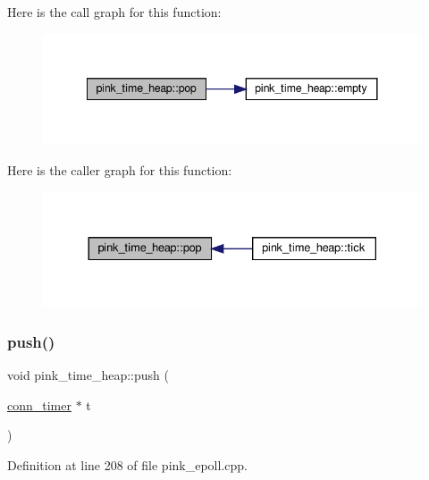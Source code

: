 Here is the call graph for this function\+:\nopagebreak
\begin{figure}[H]
\begin{center}
\leavevmode
\includegraphics[width=341pt]{classpink__time__heap_a5642ee3340cdee7983ed63770e7109d1_cgraph}
\end{center}
\end{figure}
Here is the caller graph for this function\+:\nopagebreak
\begin{figure}[H]
\begin{center}
\leavevmode
\includegraphics[width=330pt]{classpink__time__heap_a5642ee3340cdee7983ed63770e7109d1_icgraph}
\end{center}
\end{figure}
\mbox{\label{classpink__time__heap_aa74cc12fe4a94acbe75b70a3962a862f}} 
\subsubsection{\texorpdfstring{push()}{push()}}
{\footnotesize\ttfamily void pink\+\_\+time\+\_\+heap\+::push (\begin{DoxyParamCaption}\item[{\hyperlink{classconn__timer}{conn\+\_\+timer} $\ast$}]{t }\end{DoxyParamCaption})}



Definition at line 208 of file pink\+\_\+epoll.\+cpp.

\mbox{\label{classpink__time__heap_a9193dc948c6bb00005bf6639f2169b57}} 
